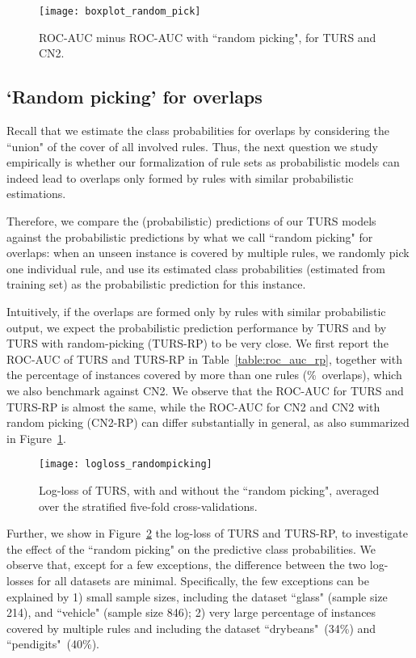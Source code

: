 
\begin{figure}[ht] \centering
\texttt{[image: boxplot\_random\_pick]}	
\caption{ROC-AUC minus ROC-AUC with ``random picking", for TURS and CN2. } \label{fig:diff_rp}
\end{figure}
\subsection{`Random picking' for overlaps}
Recall that we estimate the class probabilities for overlaps by considering the ``union" of the cover of all involved rules. Thus, the next question we study empirically is whether our formalization of rule sets as probabilistic models can indeed lead to overlaps only formed by rules with similar probabilistic estimations. 

Therefore, we compare the (probabilistic) predictions of our TURS models against the probabilistic predictions by what we call ``random picking" for overlaps: when an unseen instance is covered by multiple rules, we randomly pick one individual rule, and use its estimated class probabilities (estimated from training set) as the probabilistic prediction for this instance. 

Intuitively, if the overlaps are formed only by rules with similar probabilistic output, we expect the probabilistic prediction performance by TURS and by TURS with random-picking (TURS-RP) to be very close. We first report the ROC-AUC of TURS and TURS-RP in Table~\ref{table:roc_auc_rp}, together with the percentage of instances covered by more than one rules (\%~overlaps), which we also benchmark against CN2. We observe that the ROC-AUC for TURS and TURS-RP is almost the same, while the ROC-AUC for CN2 and CN2 with random picking (CN2-RP) can differ substantially in general, as also summarized in Figure~\ref{fig:diff_rp}.
\begin{figure}[ht] \centering 
	\texttt{[image: logloss\_randompicking]}
	\caption{Log-loss of TURS, with and without the ``random picking", averaged over the stratified five-fold cross-validations. } \label{fig:logloss_rp}
\end{figure}

Further, we show in Figure~\ref{fig:logloss_rp} the log-loss of TURS and TURS-RP, to investigate the effect of the ``random picking" on the predictive class probabilities. We observe that, except for a few exceptions, the difference between the two log-losses for all datasets are minimal. Specifically, the few exceptions can be explained by 1) small sample sizes, including the dataset ``glass" (sample size 214), and ``vehicle" (sample size 846); 2) very large percentage of instances covered by multiple rules and including the dataset ``drybeans"~(34\%) and ``pendigits"~(40\%). 

